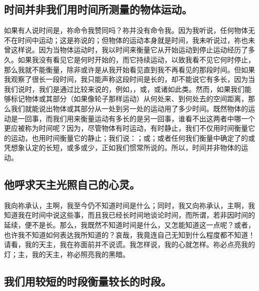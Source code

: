 \subsection{时间并非我们用时间所测量的物体运动。}

如果有人说时间是，祢命令我赞同吗？祢并没有命令我。因为我听说，任何物体无不在时间中运动；这是祢说的；但物体的运动本身就是时间，我未听说过，祢也未曾这样说。因为当物体运动时，我以时间来衡量它从开始运动到停止运动经历了多久。如果我没有看见它是何时开始的，而它持续运动，以致我看不见它何时停止，那么我就不能衡量，除非或许是从我开始看见直到我不再看见的那段时间。但如果我观察了很长一段时间，我只能声称这段时间是长的，却不能说它有多长，因为当我们说时，我们是通过比较来说的，例如，，或，或诸如此类。然而，如果我们能够标记物体或其部分（如果像轮子那样运动）从何处来、到何处去的空间距离，那么我们就能说出物体或其部分从一处到另一处的运动用了多少时间。既然物体的运动是一回事，而我们用来衡量运动有多长的是另一回事，谁看不出这两者中哪一个更应被称为时间呢？因为，尽管物体有时运动，有时静止，我们不仅用时间衡量它的运动，也用时间衡量它的静止；我们说：；或；或者任何我们衡量中确定了的或凭想象认定的长短，或多或少，正如我们惯常所说的。所以，时间并非物体的运动。\par


\subsection{他呼求天主光照自己的心灵。}

我向祢承认，主啊，我至今仍不知道时间是什么；同时，我又向祢承认，主啊，我知道我在时间中说这些事，而且我已经长时间地谈论时间，而所谓，若非因时间的延续，便不是长。那么，我既然不知道时间是什么，又怎能知道这一点呢？或者，也许我不知道如何表达我所知道的？哀哉，我竟连自己无知到什么程度都不知道！请看，我的天主，我在祢面前并不说谎。我怎样说，我的心就怎样。祢必点亮我的灯；主，我的天主，祢必照亮我的黑暗。\par


\subsection{我们用较短的时段衡量较长的时段。}

